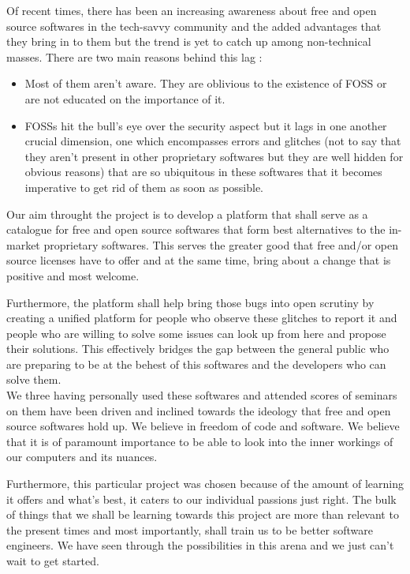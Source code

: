 \begin{abstractslong}

Of recent times, there has been an increasing awareness about free and open source softwares in the tech-savvy community and the added advantages that they bring in to them but the trend is yet to catch up among non-technical masses. There are two main reasons behind this lag : 
\begin{itemize}
\item Most of them aren't aware. They are oblivious to the existence of FOSS or are not educated on the importance of it.
\item FOSSs hit the bull’s eye over the security aspect but it lags in one another crucial dimension, one which encompasses errors and glitches (not to say that they aren't present in other proprietary softwares but they are well hidden for obvious reasons) that are so ubiquitous in these softwares that it becomes imperative to get rid of them as soon as possible.
\end{itemize}


Our aim throught the project is to develop a platform that shall serve as a catalogue for free and open source softwares that form best alternatives to the in-market proprietary softwares. This serves the greater good that free and/or open source licenses have to offer and at the same time, bring about a change that is positive and most welcome.

Furthermore, the platform shall help bring those bugs into open scrutiny by creating a unified platform for people who observe these glitches to report it and people who are willing to solve some issues can look up from here and propose their solutions. This effectively bridges the gap between the general public who are preparing to be at the behest of this softwares and the developers who can solve them.
\\

We three having personally used these softwares and attended scores of seminars on them have been driven and inclined towards the ideology that free and open source softwares hold up. We believe in freedom of code and software. We believe that it is of paramount importance to be able to look into the inner workings of our computers and its nuances.

Furthermore, this particular project was chosen because of the amount of learning it offers and what’s best, it caters to our individual passions just right. The bulk of things that we shall be learning towards this project are more than relevant to the present times and most importantly, shall train us to be better software engineers. We have seen through the possibilities in this arena and we just can’t wait to get started.
\end{abstractslong}
